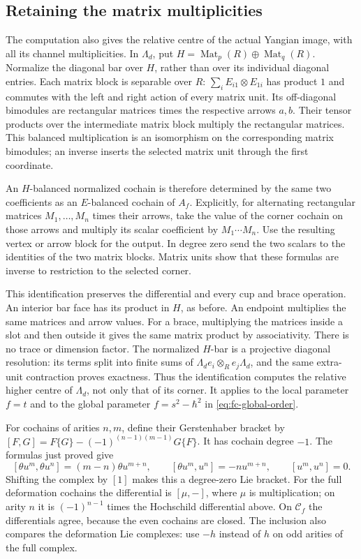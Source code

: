 \subsection{Retaining the matrix multiplicities}

The computation also gives the relative centre of the actual Yangian
image, with all its channel multiplicities. In \(\Lambda_d\), put
\(H=\operatorname{Mat}_p(R)\oplus\operatorname{Mat}_q(R)\).
Normalize the diagonal bar over \(H\), rather than over its individual
diagonal entries. Each matrix block is separable over \(R\):
\(\sum_iE_{i1}\otimes E_{1i}\) has product \(1\) and commutes with
the left and right action of every matrix unit. Its off-diagonal
bimodules are rectangular matrices times the respective arrows \(a,b\).
Their tensor products over the intermediate matrix block multiply
the rectangular matrices. This balanced multiplication is an isomorphism
on the corresponding matrix bimodules; an inverse inserts the selected
matrix unit through the first coordinate.

An \(H\)-balanced normalized cochain is therefore determined by the same
two coefficients as an \(E\)-balanced cochain of \(A_f\).
Explicitly, for alternating rectangular matrices \(M_1,\ldots,M_n\)
times their arrows, take the value of the corner cochain on those
arrows and multiply its scalar coefficient by \(M_1\cdots M_n\).
Use the resulting vertex or arrow block for the output.
In degree zero send the two scalars to the identities of the two
matrix blocks. Matrix units show that these formulas are inverse to
restriction to the selected corner.

This identification preserves the differential and every cup and
brace operation. An interior bar face has its product in \(H\), as
before. An endpoint multiplies the same matrices and arrow values.
For a brace, multiplying the matrices inside a slot and then outside
it gives the same matrix product by associativity. There is no trace
or dimension factor. The normalized \(H\)-bar is a projective diagonal
resolution: its terms split into finite sums of
\(\Lambda_de_i\otimes_R e_j\Lambda_d\), and the same extra-unit
contraction proves exactness. Thus the identification computes the
relative higher centre of \(\Lambda_d\), not only that of its corner.
It applies to the local parameter \(f=t\) and to the global parameter
\(f=s^2-\hbar^2\) in \eqref{eq:fc-global-order}.

For cochains of arities \(n,m\), define their Gerstenhaber bracket by
\([F,G]=F\{G\}-(-1)^{(n-1)(m-1)}G\{F\}\).
It has cochain degree \(-1\). The formulas just proved give
\begin{equation}\label{eq:fc-bracket}
 [\theta u^m,\theta u^n]=(m-n)\theta u^{m+n},\qquad
 [\theta u^m,u^n]=-n u^{m+n},\qquad [u^m,u^n]=0.
\end{equation}
Shifting the complex by \([1]\) makes this a degree-zero Lie bracket.
For the full deformation cochains the differential is
\([\mu,-]\), where \(\mu\) is multiplication; on arity \(n\) it is
\((-1)^{n-1}\) times the Hochschild differential above. On
\(\mathcal C_f\) the differentials agree, because the even cochains
are closed. The inclusion also compares the deformation Lie complexes:
use \(-h\) instead of \(h\) on odd arities of the full complex.

